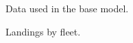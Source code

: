 \documentclass[
]{scrartcl}
\begin{document}
\newpage

\begin{figure}[H]


\caption{\label{fig-data}Data used in the base model.}

\end{figure}%

\begin{figure}[H]


\caption{\label{fig-landings}Landings by fleet.}

\end{figure}%
\end{document}
